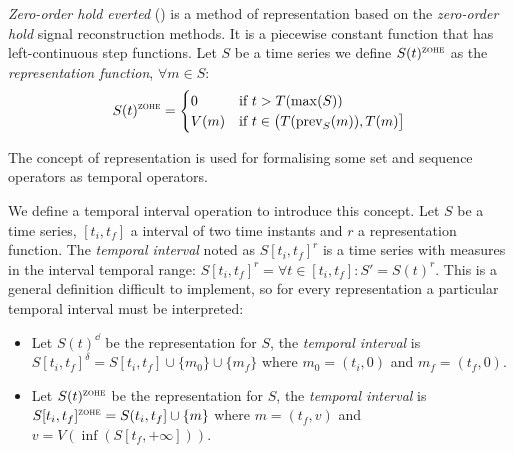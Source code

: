 \begin{definition}
  \emph{Zero-order hold everted} (\zohe{}) is a method of
  representation based on the \emph{zero-order hold} signal
  reconstruction methods. It is a piecewise constant function that has
  left-continuous step functions.  Let $S$ be a time series we define
  $S(t)^\zohe$ as the \emph{\zohe{} representation function}, $\forall
  m \in S:$
\[
    S(t)^\zohe 
    = \begin{cases}
      0 & \text{if }  t > T(\max(S)) \\
      V(m) & \text{if } t\in \big(T(\prev_S(m)),T(m)\big]
    \end{cases}
\]
\end{definition}




The concept of representation is used for formalising some set and
sequence operators as temporal operators. 



We define a temporal interval operation to introduce this
concept.
Let $S$ be a time series, $[t_i,t_f]$ a interval of two time instants
and $r$ a representation function. The \emph{temporal interval} noted
as $S[t_i,t_f]^r$ is a time series with measures in the interval
temporal range: $S[t_i,t_f]^r= \forall t \in [t_i,t_f] : S' = S(t)^r
$. This is a general definition difficult to implement, so for every
representation a particular temporal interval must be interpreted:

\begin{itemize}
\item Let $S(t)^\dd$ be the \dd{} representation for $S$, the
  \emph{\dd{} temporal interval} is $S[t_i,t_f]^\delta = S[t_i,t_f]
  \cup \{m_0\} \cup \{m_f\}$ where $m_0=(t_i,0)$ and $m_f=(t_f,0)$.

\item Let $S(t)^\zohe{}$ be the \zohe{} representation for $S$, the
  \emph{\zohe{} temporal interval} is $S[t_i,t_f]^\zohe{} = S(t_i,t_f]
  \cup \{m\}$ where $m=(t_f,v)$ and $v= V(\inf( S[t_f,+\infty] ))$.
\end{itemize}



